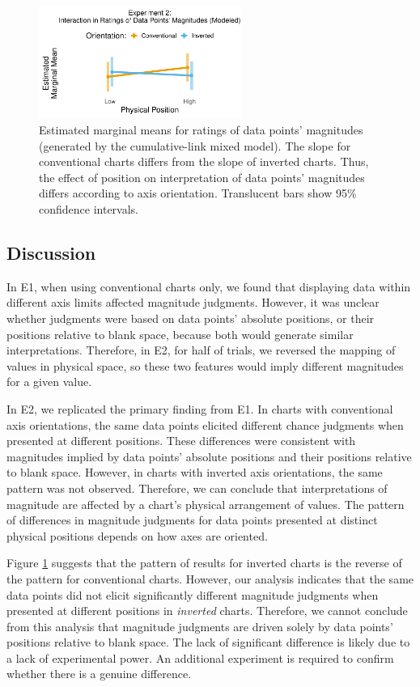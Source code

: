 \documentclass[journal]{vgtc}                %
\begin{document}
\begin{figure}
\includegraphics[width=250px]{position_magnitude_files/figure-latex/r2-int-plot-1} \caption{Estimated marginal means for ratings of data points' magnitudes (generated by the cumulative-link mixed model). The slope for conventional charts differs from the slope of inverted charts. Thus, the effect of position on interpretation of data points' magnitudes differs according to axis orientation. Translucent bars show 95\% confidence intervals.}\label{fig:r2-int-plot}
\end{figure}

\hypertarget{discussion-1}{%
\subsection{Discussion}\label{discussion-1}}

In E1, when using conventional charts only, we found that displaying
data within different axis limits affected magnitude judgments. However,
it was unclear whether judgments were based on data points' absolute
positions, or their positions relative to blank space, because both
would generate similar interpretations. Therefore, in E2, for half of
trials, we reversed the mapping of values in physical space, so these
two features would imply different magnitudes for a given value.

In E2, we replicated the primary finding from E1. In charts with
conventional axis orientations, the same data points elicited different
chance judgments when presented at different positions. These
differences were consistent with magnitudes implied by data points'
absolute positions and their positions relative to blank space. However,
in charts with inverted axis orientations, the same pattern was not
observed. Therefore, we can conclude that interpretations of magnitude
are affected by a chart's physical arrangement of values. The pattern of
differences in magnitude judgments for data points presented at distinct
physical positions depends on how axes are oriented.

Figure \ref{fig:r2-int-plot} suggests that the pattern of results for
inverted charts is the reverse of the pattern for conventional charts.
However, our analysis indicates that the same data points did not elicit
significantly different magnitude judgments when presented at different
positions in \emph{inverted} charts. Therefore, we cannot conclude from this
analysis that magnitude judgments are driven solely by data points'
positions relative to blank space. The lack of significant difference is
likely due to a lack of experimental power. An additional experiment is
required to confirm whether there is a genuine difference.
\end{document}
